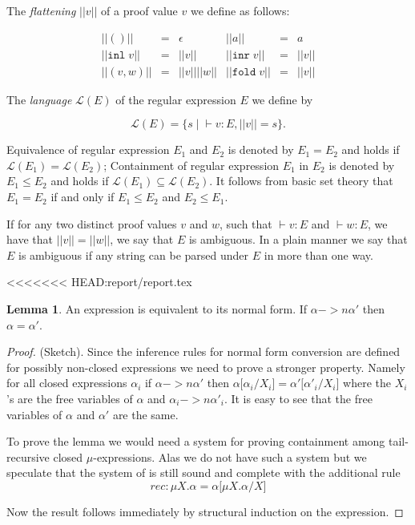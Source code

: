 \documentclass[a4paper, oneside]{memoir}
\theoremstyle{definition}
\newtheorem{lemma}{Lemma}
\begin{document}
The \emph{flattening} $||v||$ of a proof value $v$ we define as follows:

\[
\begin{array}{rclrcl}
||()|| & = & \epsilon &
||a||  & = & a \\
|| \mathtt{inl} \; v|| & = & ||v|| &
|| \mathtt{inr} \; v|| & = & ||v|| \\
|| (v,w)|| & = & ||v||||w|| &
|| \mathtt{fold} \; v|| & = & ||v||
\end{array}
\]

The \emph{language} $\mathcal{L}(E)$ of the regular expression $E$ we define by

\[
\mathcal{L}(E) = \{ s \; | \; \vdash v : E, ||v|| = s \}.
\]

Equivalence of regular expression $E_1$ and $E_2$ is denoted by $E_1 = E_2$ and holds if $\mathcal{L}(E_1) = \mathcal{L}(E_2)$;
Containment of regular expression $E_1$ in $E_2$ is denoted by $E_1 \le E_2$ and holds if $\mathcal{L}(E_1) \subseteq \mathcal{L}(E_2)$.
It follows from basic set theory that $E_1 = E_2$ if and only if $E_1 \le E_2$ and $E_2 \le E_1$.

If for any two distinct proof values $v$ and $w$, such that $\vdash v : E$ and $\vdash w : E$, we have that $||v|| = ||w||$, we say that $E$ is ambiguous. In a plain manner we say that $E$ is ambiguous if any string can be parsed under $E$ in more than one way.

<<<<<<< HEAD:report/report.tex
\begin{lemma}
  An expression is equivalent to its normal form. If $\alpha ->n \alpha'$ then
  $\alpha = \alpha'$.
  \begin{proof} (Sketch).
    Since the inference rules for normal form conversion are defined for
    possibly non-closed expressions we need to prove a stronger property. Namely
    for all closed expressions $\alpha_i$ if $\alpha ->n \alpha'$ then $\alpha
    \lbrack \alpha_i / X_i \rbrack = \alpha' \lbrack \alpha'_i / X_i \rbrack$
    where the $X_i$'s are the free variables of $\alpha$ and $\alpha_i ->n
    \alpha'_i$. It is easy to see that the free variables of $\alpha$ and
    $\alpha'$ are the same.

    To prove the lemma we would need a system for proving containment among
    tail-recursive closed $\mu$-expressions. Alas we do not have such a system
    but we speculate that the system of \cite{heli} is still sound and complete
    with the additional rule
    \[
    rec : \mu X. \alpha = \alpha \lbrack \mu X. \alpha / X \rbrack
    \]

    Now the result follows immediately by structural induction on the
    expression.
  \end{proof}
\end{lemma}
\end{document}
